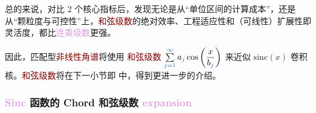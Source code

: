总的来说，对比 2 个核心指标后，发现无论是从“单位区间的计算成本”，还是从“颗粒度与可控性”上，\textcolor{Maroon}{和弦级数}的绝对效率、工程适应性和（可线性）扩展性即灵活度，都比\textcolor{Plum}{连乘级数}更强。

因此，\textcolor{PineGreen}{匹配型}\textcolor{Maroon}{非线性角谱}将使用 \textcolor{Maroon}{和弦级数} $\sum\limits^{\textcolor{NavyBlue}{\infty}}_{\textcolor{NavyBlue}{j}=\textcolor{NavyBlue}{1}} {{a_{\textcolor{NavyBlue}{j}}}\cos \left( \displaystyle{ {\dfrac{x}{{{b_{\textcolor{NavyBlue}{j}}}}}} } \right)}$ 来近似 $\text{sinc}\left( x \right)$ 卷积核。\textcolor{Maroon}{和弦级数}将在下一小节即  中，得到更进一步的介绍。

\vspace*{-2.5em}

\subsubsection{\textcolor{Plum}{Sinc} 函数的 Chord 和弦级数 \textcolor{Plum}{expansion}}\label{sssec:NLAST_sinc_chord}

